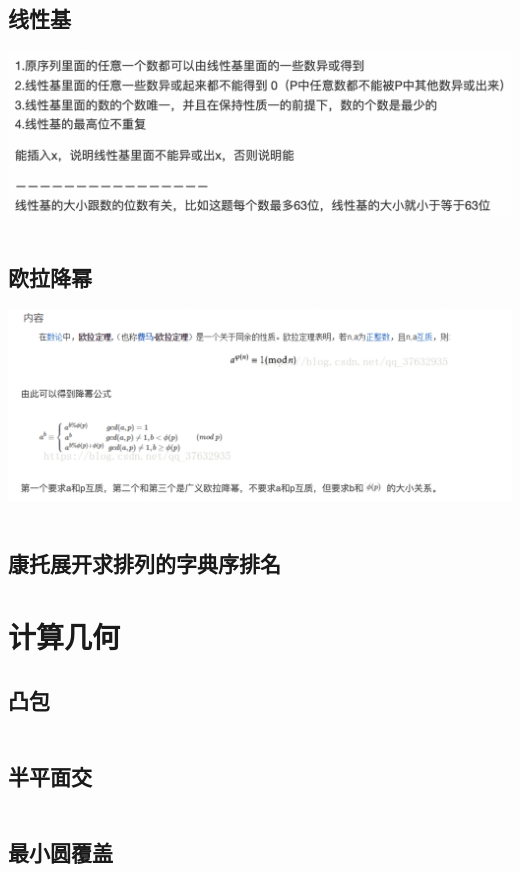 \documentclass[a4paper,11pt]{article}
\begin{document}
\subsection{线性基} %
\includegraphics[scale=0.6]{数论/线性基.png}
\inputminted[breaklines]{c++}{数论/线性基.cpp}
\subsection{欧拉降幂} %
\includegraphics[scale=0.6]{数论/欧拉降幂.png}
\inputminted[breaklines]{c++}{数论/欧拉降幂.cpp}
\subsection{康托展开求排列的字典序排名}


\newpage
\section{计算几何} %
\subsection{凸包} %
\inputminted[breaklines]{c++}{计算几何/凸包.cpp}
\subsection{半平面交} %
\inputminted[breaklines]{c++}{计算几何/半平面交.cpp}
\subsection{最小圆覆盖} %
\inputminted[breaklines]{c++}{计算几何/最小圆覆盖.cpp}
\end{document}
